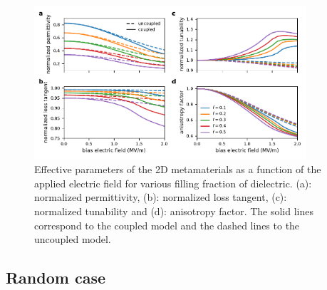 \documentclass[aps,prb,11pt]{revtex4-1}
\begin{document}
\begin{figure}[!t]
 \centering
 \includegraphics[width=0.9\textwidth]{effective_params_per}
 \caption{Effective parameters of the 2D metamaterials as a function of the
  applied electric field for various filling fraction of dielectric.
  (a): normalized permittivity, (b): normalized loss tangent, (c): normalized tunability and
  (d): anisotropy factor. The solid lines correspond to the coupled model and
  the dashed lines to the uncoupled model.}
 \label{eff_par_2D_TM}
\end{figure}

\subsection{Random case}
\end{document}
